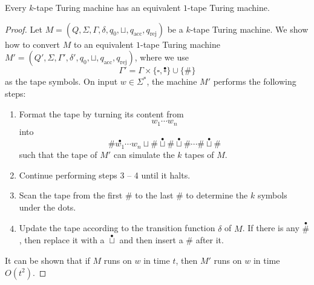 \begin{theorem}
  Every $k$-tape Turing machine has an equivalent $1$-tape Turing machine.
\end{theorem}
\begin{proof}
  Let $M = (Q, \Sigma, \Gamma, \delta, q_0, \sqcup, q_\text{acc},
  q_\text{rej})$ be a $k$-tape Turing machine.
  We show how to convert $M$ to an equivalent $1$-tape Turing machine
  $M' = (Q', \Sigma, \Gamma', \delta', q_0, \sqcup, q_\text{acc},
  q_\text{rej})$, where we use
  \begin{equation*}
    \Gamma' = \Gamma \times \{\square, \overset\bullet\square\}
    \cup \{\#\}
  \end{equation*}
  as the tape symbols.
  On input $w \in \Sigma^*$, the machine $M'$ performs the following steps:
  \begin{enumerate}[1.]
    \item Format the tape by turning its content from
    \begin{equation*}
      w_1 \cdots w_n
    \end{equation*}
    into
    \begin{equation*}
      \# \overset\bullet{w_1} \cdots w_n \sqcup \# \overset\bullet{\sqcup} \#
      \overset\bullet{\sqcup} \# \cdots \# \overset\bullet{\sqcup} \#
    \end{equation*}
    such that the tape of $M'$ can simulate the $k$ tapes of $M$.
    \item Continue performing steps 3 -- 4 until it halts.
    \item Scan the tape from the first $\#$ to the last $\#$ to determine the
    $k$ symbols under the dots.
    \item Update the tape according to the transition function $\delta$ of $M$.
    If there is any $\overset\bullet\#$, then replace it with a
    $\overset\bullet\sqcup$ and then insert a $\#$ after it.
  \end{enumerate}
  It can be shown that if $M$ runs on $w$ in time $t$, then $M'$ runs on $w$
  in time $O(t^2)$.
\end{proof}

